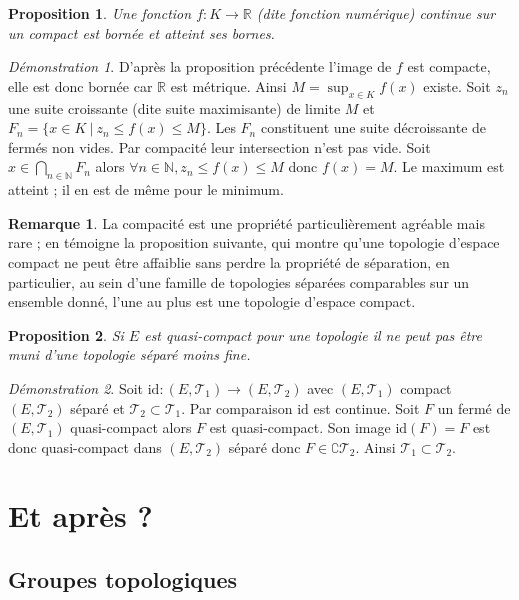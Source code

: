\documentclass[a4paper, 11pt, french]{book}
\theoremstyle{plain} %
\newtheorem{proposition}{Proposition}
\theoremstyle{definition} %
\newtheorem{remarque}{Remarque}
\theoremstyle{remark} %
\newtheorem*{demonstration}{Démonstration}
\newcommand{\1}{\mathds{1}}
\newcommand{\id}{\mathrm{id}}
\newcommand{\N}{\mathbb{N}}
\newcommand{\R}{\mathbb{R}}
\newcommand{\scr}[1]{\mathscr{#1}}
\newcommand\ens[2]{\{#1 \ |\ #2\}}
\begin{document}
\begin{proposition}
	Une fonction $f:K\rightarrow\R$ (dite fonction numérique) continue sur un compact est bornée et atteint ses bornes.
\end{proposition}

\begin{demonstration}
	D’après la proposition précédente l’image de $f$ est compacte, elle est donc bornée car $\R$ est métrique.
	Ainsi $M=\sup_{x\in K}f(x)$ existe.
	Soit $z_n$ une suite croissante (dite suite maximisante) de limite $M$ et $F_n=\ens{x\in K}{z_n\leqslant f(x)\leqslant M}$.
	Les $F_n$ constituent une suite décroissante de fermés non vides.
	Par compacité leur intersection n’est pas vide.
	Soit $x\in\bigcap_{n\in\N}F_n$ alors $\forall n\in\N, z_n\leqslant f(x)\leqslant M$ donc $f(x)=M$.
	Le maximum est atteint ; il en est de même pour le minimum.
\end{demonstration}

\begin{remarque}
	La compacité est une propriété particulièrement agréable mais rare ; en témoigne la proposition suivante, qui montre qu’une topologie d’espace compact ne peut être affaiblie sans perdre la propriété de séparation, en particulier, au sein d’une famille de topologies séparées comparables sur un ensemble donné, l’une au plus est une topologie d’espace compact.
\end{remarque}

\begin{proposition}
	Si $E$ est quasi-compact pour une topologie il ne peut pas être muni d’une topologie séparé moins fine.
\end{proposition}

\begin{demonstration}
	Soit $\id:(E, \scr{T}_1)\rightarrow(E, \scr{T}_2)$ avec $(E, \scr{T}_1)$ compact $(E, \scr{T}_2)$ séparé et $\scr{T}_2\subset\scr{T}_1$.
	Par comparaison $\id$ est continue.
	Soit $F$ un fermé de $(E, \scr{T}_1)$ quasi-compact alors $F$ est quasi-compact.
	Son image $\id(F)=F$ est donc quasi-compact dans $(E, \scr{T}_2)$ séparé donc $F\in\complement\scr{T}_2$.
	Ainsi $\scr{T}_1\subset\scr{T}_2$.
\end{demonstration}

\part{Et après ?}

\chapter{Groupes topologiques}
\end{document}
